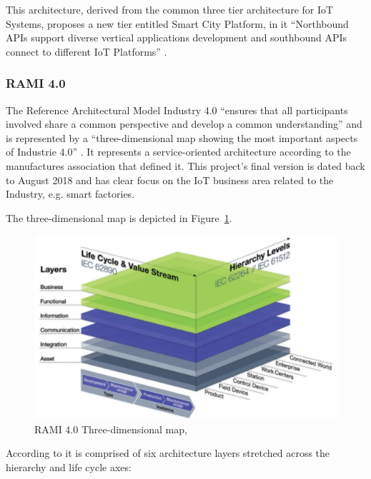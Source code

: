 This architecture, derived from the common three tier architecture for \gls{IoT} Systems, proposes a new tier entitled Smart City Platform, in it ``Northbound APIs support diverse vertical applications development and southbound APIs connect to different IoT Platforms'' \parencite{9032420}.

\subsubsection{RAMI 4.0}
\label{subsubsec:stateofart:arch:rami}

The Reference Architectural Model Industry 4.0 ``ensures that all participants involved share a common perspective and develop a common understanding'' and is represented by a ``three-dimensional map showing the most important aspects of Industrie 4.0'' \parencite{hankel2015reference}. It represents a service-oriented architecture according to the manufactures association that defined it. This project's final version is dated back to August 2018 and has clear focus on the \gls{IoT} business area related to the Industry, e.g. smart factories.

The three-dimensional map is depicted in Figure~\ref{fig:stateofart:arch:rami:map}.

\begin{figure}[H]
    \centering
    \includegraphics[scale=0.4]{assets/figures/rami.png}
    \caption[RAMI 4.0 Three-dimensional map]{RAMI 4.0 Three-dimensional map, \cite{rami}}
    \label{fig:stateofart:arch:rami:map}
\end{figure}

According to \cite{rami-explained} it is comprised of six architecture layers stretched across the hierarchy and life cycle axes:

